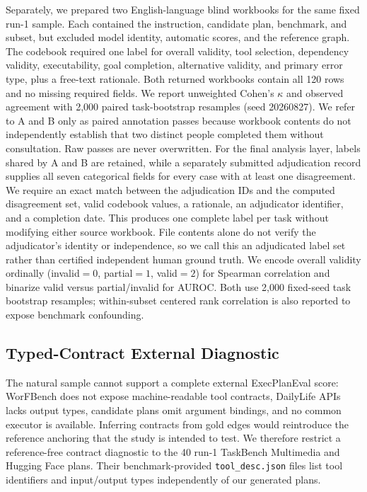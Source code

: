 \documentclass[10pt]{article}
\begin{document}
Separately, we prepared two English-language blind workbooks for the same
fixed run-1 sample. Each contained the instruction, candidate plan, benchmark,
and subset, but excluded model identity, automatic scores, and the reference
graph. The codebook required one label for overall validity, tool selection,
dependency validity, executability, goal completion, alternative validity, and
primary error type, plus a free-text rationale. Both returned workbooks contain
all 120 rows and no missing required fields. We report unweighted Cohen's
$\kappa$ and observed agreement with 2,000 paired task-bootstrap resamples
(seed 20260827). We refer to A and B only as paired annotation passes because
workbook contents do not independently establish that two distinct people
completed them without consultation. Raw passes are never overwritten. For the
final analysis layer, labels shared by A and B are retained, while a separately
submitted adjudication record supplies all seven categorical fields for every
case with at least one disagreement. We require an exact match between the
adjudication IDs and the computed disagreement set, valid codebook values, a
rationale, an adjudicator identifier, and a completion date. This produces one
complete label per task without modifying either source workbook. File contents
alone do not verify the adjudicator's identity or independence, so we call this
an adjudicated label set rather than certified independent human ground truth.
We encode overall validity ordinally (invalid$=0$, partial$=1$, valid$=2$) for
Spearman correlation and binarize valid versus partial/invalid for AUROC. Both
use 2,000 fixed-seed task bootstrap resamples; within-subset centered rank
correlation is also reported to expose benchmark confounding.

\subsection{Typed-Contract External Diagnostic}
The natural sample cannot support a complete external ExecPlanEval score:
WorFBench does not expose machine-readable tool contracts, DailyLife APIs lacks
output types, candidate plans omit argument bindings, and no common executor is
available. Inferring contracts from gold edges would reintroduce the reference
anchoring that the study is intended to test. We therefore restrict a
reference-free contract diagnostic to the 40 run-1 TaskBench Multimedia and
Hugging Face plans. Their benchmark-provided \texttt{tool\_desc.json} files list
tool identifiers and input/output types independently of our generated plans.
\end{document}
